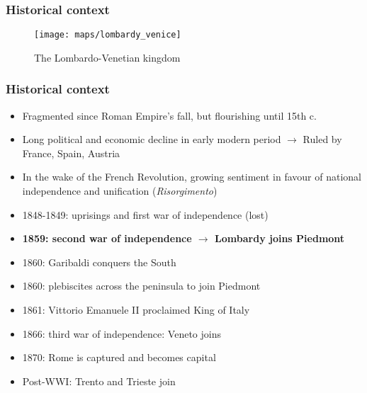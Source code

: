 \documentclass[10pt]{beamer}
\begin{document}
\iffalse
\begin{frame}
    \frametitle{Historical context}
    
    \begin{figure}
        \centering
        \texttt{[image: maps/austrian\_empire\_1855.jpg]}
        \caption{The Austrian empire in 1855}
        \label{fig:map_austria_1855}
    \end{figure}
    
\end{frame}
\fi

\begin{frame}
    \frametitle{Historical context}
    
    \begin{figure}
        \centering
        \texttt{[image: maps/lombardy\_venice]}
        \caption{The Lombardo-Venetian kingdom}
        \label{fig:map_lombardy_venice}
    \end{figure}
    
\end{frame}

\begin{frame}
    \frametitle{Historical context}
    
    \begin{itemize}
        \item Fragmented since Roman Empire's fall, but flourishing until 15th c.
        \item Long political and economic decline in early modern period $\rightarrow$ Ruled by France, Spain, Austria
        \item In the wake of the French Revolution, growing sentiment in favour of national independence and unification (\textit{Risorgimento})
        \item 1848-1849: uprisings and first war of independence (lost)
        \item \textbf{1859: second war of independence $\rightarrow$ Lombardy joins Piedmont}
        \item 1860: Garibaldi conquers the South
        \item 1860: plebiscites across the peninsula to join Piedmont
        \item 1861: Vittorio Emanuele II proclaimed King of Italy
        \item 1866: third war of independence: Veneto joins
        \item 1870: Rome is captured and becomes capital
        \item Post-WWI: Trento and Trieste join
    \end{itemize}
    
\end{frame}
\end{document}
